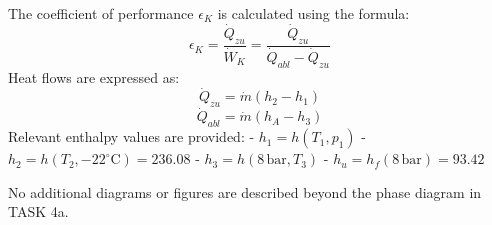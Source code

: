 The coefficient of performance \( \epsilon_K \) is calculated using the formula:  
\[
\epsilon_K = \frac{\dot{Q}_{zu}}{\dot{W}_K} = \frac{\dot{Q}_{zu}}{\dot{Q}_{abl} - \dot{Q}_{zu}}
\]  
Heat flows are expressed as:  
\[
\dot{Q}_{zu} = \dot{m}(h_2 - h_1)  
\]  
\[
\dot{Q}_{abl} = \dot{m}(h_A - h_3)  
\]  
Relevant enthalpy values are provided:  
- \( h_1 = h(T_1, p_1) \)  
- \( h_2 = h(T_2, -22^\circ\text{C}) = 236.08 \)  
- \( h_3 = h(8 \, \text{bar}, T_3) \)  
- \( h_u = h_f(8 \, \text{bar}) = 93.42 \)  

No additional diagrams or figures are described beyond the phase diagram in TASK 4a.